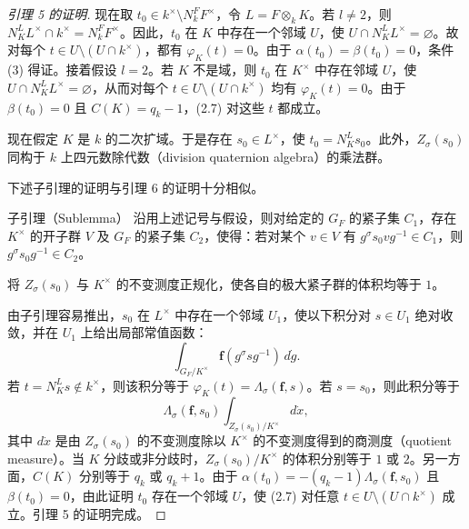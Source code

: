 \begin{proof}[引理 5 的证明]
现在取 $t_0\in k^\times\setminus N_k^FF^\times$，令 $L=F\otimes_kK$。若 $l\ne2$，则 $N_K^LL^\times\cap k^\times=N_k^FF^\times$。因此，$t_0$ 在 $K$ 中存在一个邻域 $U$，使 $U\cap N_K^LL^\times=\varnothing$。故对每个 $t\in U\setminus(U\cap k^\times)$，都有 $\varphi_K(t)=0$。由于 $\alpha(t_0)=\beta(t_0)=0$，条件 (3) 得证。接着假设 $l=2$。若 $K$ 不是域，则 $t_0$ 在 $K^\times$ 中存在邻域 $U$，使 $U\cap N_K^LL^\times=\varnothing$，从而对每个 $t\in U\setminus(U\cap k^\times)$ 均有 $\varphi_K(t)=0$。由于 $\beta(t_0)=0$ 且 $C(K)=q_k-1$，(2.7) 对这些 $t$ 都成立。

现在假定 $K$ 是 $k$ 的二次扩域。于是存在 $s_0\in L^\times$，使 $t_0=N_K^Ls_0$。此外，$Z_\sigma(s_0)$ 同构于 $k$ 上四元数除代数（division quaternion algebra）的乘法群。

下述子引理的证明与引理 6 的证明十分相似。

\begin{originaltheorem}{子引理（Sublemma）}
沿用上述记号与假设，则对给定的 $G_F$ 的紧子集 $C_1$，存在 $K^\times$ 的开子群 $V$ 及 $G_F$ 的紧子集 $C_2$，使得：若对某个 $v\in V$ 有 $g^\sigma s_0vg^{-1}\in C_1$，则 $g^\sigma s_0g^{-1}\in C_2$。
\end{originaltheorem}

将 $Z_\sigma(s_0)$ 与 $K^\times$ 的不变测度正规化，使各自的极大紧子群的体积均等于 $1$。

由子引理容易推出，$s_0$ 在 $L^\times$ 中存在一个邻域 $U_1$，使以下积分对 $s\in U_1$ 绝对收敛，并在 $U_1$ 上给出局部常值函数：
\[
 \int_{G_F/K^\times}\boldsymbol f(g^\sigma sg^{-1})\,d\dot g.
\]
若 $t=N_K^Ls\notin k^\times$，则该积分等于 $\varphi_K(t)=\Lambda_\sigma(\boldsymbol f,s)$。若 $s=s_0$，则此积分等于
\[
 \Lambda_\sigma(\boldsymbol f,s_0)
 \int_{Z_\sigma(s_0)/K^\times}d\dot x,
\]
其中 $d\dot x$ 是由 $Z_\sigma(s_0)$ 的不变测度除以 $K^\times$ 的不变测度得到的商测度（quotient measure）。当 $K$ 分歧或非分歧时，$Z_\sigma(s_0)/K^\times$ 的体积分别等于 $1$ 或 $2$。另一方面，$C(K)$ 分别等于 $q_k$ 或 $q_k+1$。由于 $\alpha(t_0)=-(q_k-1)\Lambda_\sigma(\boldsymbol f,s_0)$ 且 $\beta(t_0)=0$，由此证明 $t_0$ 存在一个邻域 $U$，使 (2.7) 对任意 $t\in U\setminus(U\cap k^\times)$ 成立。引理 5 的证明完成。
\end{proof}

